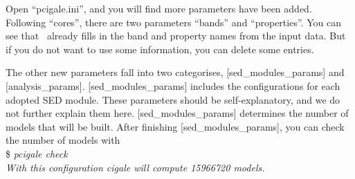 Open ``pcigale.ini'', and you will find more parameters have been added. 
Following ``cores'', there are two parameters ``bands'' and ``properties''. 
You can see that \xcig\ already fills in the band and property names from the input data. 
But if you do not want to use some information, you can delete some entries.  

The other new parameters fall into two categorises, [sed\_modules\_params] and [analysis\_params]. 
[sed\_modules\_params] includes the configurations for each adopted SED module. 
These parameters should be self-explanatory, and we do not further explain them here. 
[sed\_modules\_params] determines the number of models that will be built. 
After finishing [sed\_modules\_params], you can check the number of models with \\
\$ \textit{pcigale check} \\
\textit{With this configuration cigale will compute 15966720 models.} \\

